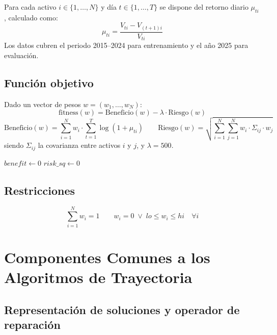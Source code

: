 \documentclass[12pt,a4paper]{article}
\begin{document}
Para cada activo $i \in \{1,\ldots,N\}$ y día $t \in \{1,\ldots,T\}$ se dispone
del retorno diario $\mu_{ti}$, calculado como:
\[
  \mu_{ti} = \frac{V_{ti} - V_{(t+1)i}}{V_{ti}}
\]
Los datos cubren el periodo 2015--2024 para entrenamiento y el año 2025 para evaluación.

\subsection*{Función objetivo}

Dado un vector de pesos $w = (w_1,\ldots,w_N)$:
\[
  \text{fitness}(w) = \text{Beneficio}(w) - \lambda \cdot \text{Riesgo}(w)
\]
\[
  \text{Beneficio}(w) = \sum_{i=1}^{N} w_i \cdot \sum_{t=1}^{T}\log(1+\mu_{ti})
  \qquad
  \text{Riesgo}(w) = \sqrt{\sum_{i=1}^{N}\sum_{j=1}^{N} w_i \cdot \Sigma_{ij} \cdot w_j}
\]
siendo $\Sigma_{ij}$ la covarianza entre activos $i$ y $j$, y $\lambda = 500$.

\begin{algorithm}[H]
\caption{Cálculo de fitness$(w)$}
$benefit \leftarrow 0$\;
$risk\_sq \leftarrow 0$\;
\end{algorithm}

\subsection*{Restricciones}

\[
  \sum_{i=1}^{N} w_i = 1 \qquad
  w_i = 0 \;\vee\; lo \le w_i \le hi \quad \forall i
\]

\section{Componentes Comunes a los Algoritmos de Trayectoria}

\subsection{Representación de soluciones y operador de reparación}
\end{document}

